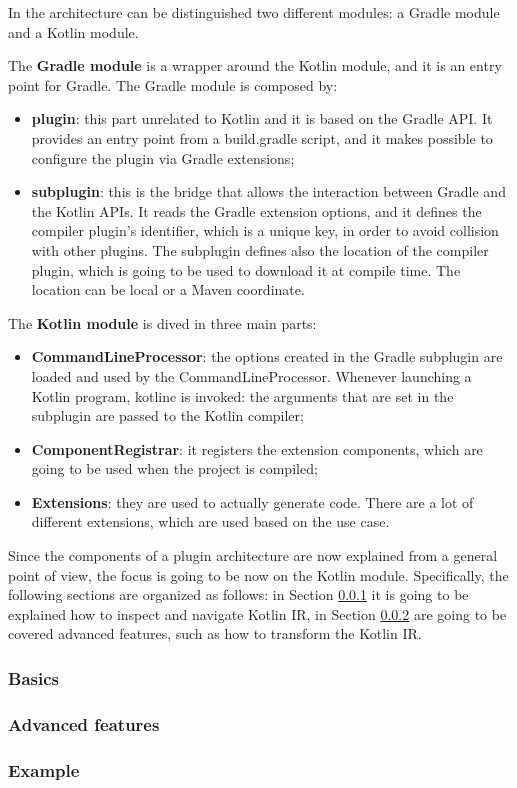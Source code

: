 In the architecture can be distinguished two different modules: a Gradle module and a Kotlin module.

The \textbf{Gradle module} is a wrapper around the Kotlin module, and it is an entry point for Gradle. The Gradle module is composed by:
\begin{itemize}
    \item \textbf{plugin}: this part unrelated to Kotlin and it is based on the Gradle API. It provides an entry point from a build.gradle script, and it makes possible to configure the plugin via Gradle extensions;
    \item \textbf{subplugin}: this is the bridge that allows the interaction between Gradle and the Kotlin APIs. It reads the Gradle extension options, and it defines the compiler plugin's identifier, which is a unique key, in order to avoid collision with other plugins. The subplugin defines also the location of the compiler plugin, which is going to be used to download it at compile time. The location can be local or a Maven coordinate.
\end{itemize}

The \textbf{Kotlin module} is dived in three main parts:
\begin{itemize}
    \item \textbf{CommandLineProcessor}: the options created in the Gradle subplugin are loaded and used by the CommandLineProcessor. Whenever launching a Kotlin program, kotlinc is invoked: the arguments that are set in the subplugin are passed to the Kotlin compiler;
    \item \textbf{ComponentRegistrar}: it registers the extension components, which are going to be used when the project is compiled;
    \item \textbf{Extensions}: they are used to actually generate code. There are a lot of different extensions, which are used based on the use case.
\end{itemize}

Since the components of a plugin architecture are now explained from a general point of view, the focus is going to be now on the Kotlin module.
Specifically, the following sections are organized as follows: in Section \ref{section:compiler_plugin_basics} it is going to be explained how to inspect and navigate Kotlin IR, in Section \ref{section:compiler_plugin_advaced} are going to be covered advanced features, such as how to transform the Kotlin IR.

\subsubsection{Basics}\label{section:compiler_plugin_basics}

\subsubsection{Advanced features}\label{section:compiler_plugin_advaced}
\subsubsection{Example}\label{section:compiler_plugin_example}
